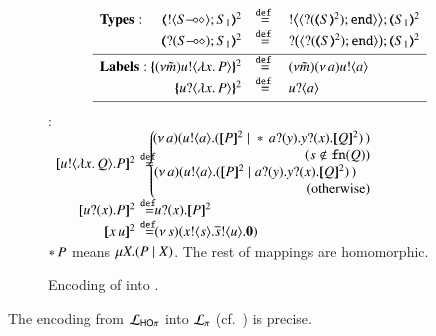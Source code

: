 \begin{figure}[t]
\[
\begin{array}{l}
	\begin{array}{rcl}
\noindent{\bf Types:}\hspace{0.5cm} 
		\tmap{\btout{\lhot{S}}S_1}{2} & \defeq & \bbtout{\chtype{\btinp{\tmap{S}{2}}\tinact}}\tmap{S_1}{2} \\
		\tmap{\btinp{\lhot{S}}S_1}{2} & \defeq & \bbtinp{\chtype{\btinp{\tmap{S}{2}}\tinact}}\tmap{S_1}{2} 
\\[1mm]
\hline
\noindent{\bf Labels:}\ 
		\mapa{(\nu \tilde{m})\bactout{u}{\abs{ x}{P}} }^2  & \defeq & (\nu \tilde{m})\news{a} \bactout{u}{a} \\
		\mapa{\bactinp{u}{\abs{ x}{P}} }^2 &  \defeq & \bactinp{u}{a}
\\[1mm]
\hline
\end{array}
\end{array}
\]
\hspace{4mm}{\bf Terms} :\\
\noi$
\begin{array}{rcll}
		\pmap{\bout{u}{\abs{x}{Q}} P}{2} &\!\!\!\! \defeq \!\!\!\!\!\!\!\!&\!\!\!  \left\{
		\begin{array}{r}
		\!\!\!\!	\newsp{a}{\bout{u}{a} (\pmap{P}{2} \Par \repl{} \binp{a}{y} \binp{y}{x} \pmap{Q}{2})\,}\\
                  (s \notin \fn{Q}) \\
		\!\!\!\!	\newsp{a}{\bout{u}{a} (\pmap{P}{2} \Par \binp{a}{y} \binp{y}{x} \pmap{Q}{2})\,}\quad\\
            \textrm{(otherwise)} %
		\end{array}
		\right.
		\\
\pmap{\binp{u}{x} P}{2} &\!\!\!\! \defeq \!\!\!\! \!\!\!\! &  \binp{u}{x} \pmap{P}{2}\\
\pmap{\appl{x}{u}}{2} & \!\!\!\! \defeq \!\!\!\! \!\!\!\! & \newsp{s}{\bout{x}{s} \bout{\dual{s}}{u} \inact}\\

	\end{array}
$\\[3mm]
$\repl{} P$ means $\recp{X}{(P \Par \rvar{X})}$.
The rest of mappings are homomorphic.\\ 
	\caption{
Encoding of \HOp into \sessp.
\label{f:enc:ho_to_sessp}
}
\Hlinefig
\end{figure}

\begin{theorem}
\label{f:enc:hotopi}
The encoding from $\mathcal{L}_{\mathsf{HO}\pi}$ into $\mathcal{L}_{\pi}$ (cf.~)
is precise. 
\end{theorem}




